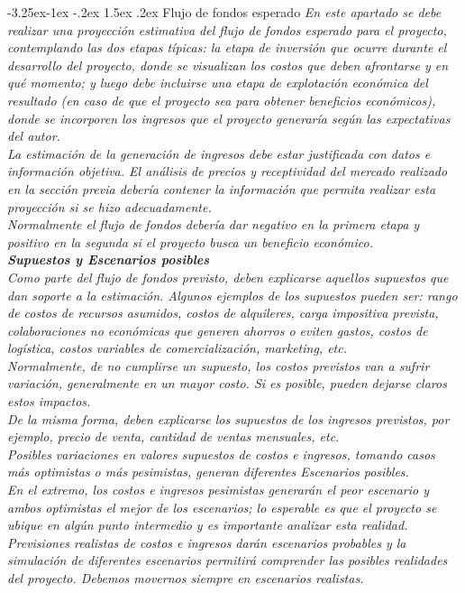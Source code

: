 \documentclass[12pt]{article}
\makeatletter
\renewcommand\paragraph{\@startsection{paragraph}{4}{\z@}%
                                     {-3.25ex\@plus -1ex \@minus -.2ex}%
                                     {1.5ex \@plus .2ex}%
                                     {\normalfont\normalsize\bfseries}}
\makeatother
\begin{document}
    \paragraph{Flujo de fondos esperado}
    {\it
    En este apartado se debe realizar una proyección estimativa del flujo de fondos esperado para el proyecto, contemplando las dos etapas típicas: la etapa de inversión que ocurre durante el desarrollo del proyecto, donde se visualizan los costos que deben afrontarse y en qué momento; y luego debe incluirse una etapa de explotación económica del resultado (en caso de que el proyecto sea para obtener beneficios económicos), donde se incorporen los ingresos que el proyecto generaría según las expectativas del autor.\\
    La estimación de la generación de ingresos debe estar justificada con datos e información objetiva. El análisis de precios y receptividad del mercado realizado en la sección previa debería contener la información que permita realizar esta proyección si se hizo adecuadamente.\\
    Normalmente el flujo de fondos debería dar negativo en la primera etapa y positivo en la segunda si el proyecto busca un beneficio económico.\\

    {\bf Supuestos y Escenarios posibles}\\
    Como parte del flujo de fondos previsto, deben explicarse aquellos supuestos que dan soporte a la estimación. Algunos ejemplos de los supuestos pueden ser: rango de costos de recursos asumidos, costos de alquileres, carga impositiva prevista, colaboraciones no económicas que generen ahorros o eviten gastos, costos de logística, costos variables de comercialización, marketing, etc.\\
    Normalmente, de no cumplirse un supuesto, los costos previstos van a sufrir variación, generalmente en un mayor costo. Si es posible, pueden dejarse claros estos impactos.\\
    De la misma forma, deben explicarse los supuestos de los ingresos previstos, por ejemplo, precio de venta, cantidad de ventas mensuales, etc.\\
    Posibles variaciones en valores supuestos de costos e ingresos, tomando casos más optimistas o más pesimistas, generan diferentes Escenarios posibles.\\
    En el extremo, los costos e ingresos pesimistas generarán el peor escenario y ambos optimistas el mejor de los escenarios; lo esperable es que el proyecto se ubique en algún punto intermedio y es importante analizar esta realidad.\\
    Previsiones realistas de costos e ingresos darán escenarios probables y la simulación de diferentes escenarios permitirá comprender las posibles realidades del proyecto. Debemos movernos siempre en escenarios realistas.
    }
\end{document}
